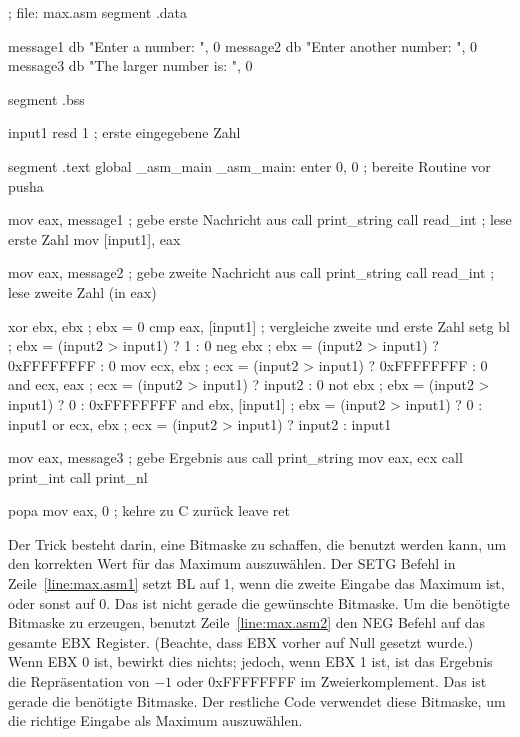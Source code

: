 \begin{AsmCodeListing}[numbers=left, commandchars=\\\{\}]
 ; file: max.asm
 segment .data

 message1 db     "Enter a number: ", 0
 message2 db     "Enter another number: ", 0
 message3 db     "The larger number is: ", 0

 segment .bss

 input1  resd    1               ; erste eingegebene Zahl

 segment .text
         global  _asm_main
 _asm_main:
         enter   0, 0            ; bereite Routine vor
         pusha

         mov     eax, message1   ; gebe erste Nachricht aus
         call    print_string
         call    read_int        ; lese erste Zahl
         mov     [input1], eax

         mov     eax, message2   ; gebe zweite Nachricht aus
         call    print_string
         call    read_int        ; lese zweite Zahl (in eax)

         xor     ebx, ebx        ; ebx = 0
         cmp     eax, [input1]   ; vergleiche zweite und erste Zahl
         setg    bl              ; ebx = (input2 > input1) ?          1 : 0 \label{line:max.asm1}
         neg     ebx             ; ebx = (input2 > input1) ? 0xFFFFFFFF : 0 \label{line:max.asm2}
         mov     ecx, ebx        ; ecx = (input2 > input1) ? 0xFFFFFFFF : 0
         and     ecx, eax        ; ecx = (input2 > input1) ?     input2 : 0
         not     ebx             ; ebx = (input2 > input1) ?          0 : 0xFFFFFFFF
         and     ebx, [input1]   ; ebx = (input2 > input1) ?          0 : input1
         or      ecx, ebx        ; ecx = (input2 > input1) ?     input2 : input1

         mov     eax, message3   ; gebe Ergebnis aus
         call    print_string
         mov     eax, ecx
         call    print_int
         call    print_nl

         popa
         mov     eax, 0          ; kehre zu C zur\"{u}ck
         leave
         ret
\end{AsmCodeListing}
\pagebreak[4]

Der Trick besteht darin, eine Bitmaske zu schaffen, die benutzt
werden kann, um den korrekten Wert f\"{u}r das Maximum auszuw\"{a}hlen. Der
{\code SETG}  Befehl in
Zeile~\ref{line:max.asm1} setzt BL auf 1, wenn die zweite Eingabe
das Maximum ist, oder sonst auf 0. Das ist nicht gerade die
gew\"{u}nschte Bitmaske. Um die ben\"{o}tigte Bitmaske zu erzeugen, benutzt
Zeile~\ref{line:max.asm2} den {\code NEG}
 Befehl auf das gesamte EBX Register.
(Beachte, dass EBX vorher auf Null gesetzt wurde.) Wenn EBX 0 ist,
bewirkt dies nichts; jedoch, wenn EBX 1 ist, ist das Ergebnis die
Repr\"{a}sentation von $-1$ oder 0xFFFFFFFF im Zweierkomplement. Das ist
gerade die ben\"{o}tigte Bitmaske. Der restliche Code verwendet diese
Bitmaske, um die richtige Eingabe als Maximum auszuw\"{a}hlen.

